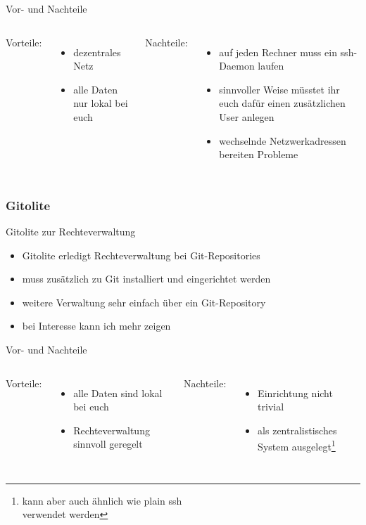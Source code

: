 \documentclass{beamer}
\begin{document}
\begin{frame}{Vor- und Nachteile}
	\begin{columns}[c]
		Vorteile:
		\begin{itemize}
			\item dezentrales Netz
			\item alle Daten nur lokal bei euch
		\end{itemize}
		Nachteile:
		\begin{itemize}
			\item auf jeden Rechner muss ein ssh-Daemon laufen
			\item sinnvoller Weise müsstet ihr euch dafür einen zusätzlichen User anlegen
			\item wechselnde Netzwerkadressen bereiten Probleme
		\end{itemize}
	\end{columns}
\end{frame}

\subsubsection{Gitolite}
\begin{frame}[fragile]{Gitolite zur Rechteverwaltung}
	\begin{itemize}
		\item Gitolite erledigt Rechteverwaltung bei Git-Repositories
		\item muss zusätzlich zu Git installiert und eingerichtet werden
		\item weitere Verwaltung sehr einfach über ein Git-Repository
		\item bei Interesse kann ich mehr zeigen
	\end{itemize}
\end{frame}

\begin{frame}{Vor- und Nachteile}
	\begin{columns}[c]
		Vorteile:
		\begin{itemize}
			\item alle Daten sind lokal bei euch
			\item Rechteverwaltung sinnvoll geregelt
		\end{itemize}
		Nachteile:
		\begin{itemize}
			\item Einrichtung nicht trivial
			\item als zentralistisches System ausgelegt\footnote{kann aber auch ähnlich wie plain ssh\\ verwendet werden}
		\end{itemize}
	\end{columns}
\end{frame}
\end{document}
